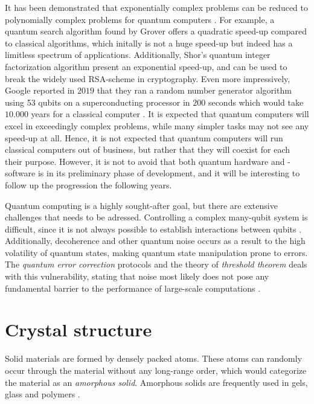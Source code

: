 It has been demonstrated that exponentially complex problems can be reduced to polynomially complex problems for quantum computers \cite{Pavicic2006}. For example, a quantum search algorithm found by Grover \cite{Grover1997} offers a quadratic speed-up compared to classical algorithms, which initally is not a huge speed-up but indeed has a limitless spectrum of applications. Additionally, Shor's quantum integer factorization algorithm \cite{Shor1994} present an exponential speed-up, and can be used to break the widely used RSA-scheme in cryptography. Even more impressively, Google reported in $2019$ that they ran a random number generator algorithm using 53 qubits on a superconducting processor in $200$ seconds which would take $10.000$ years for a classical computer \cite{Martinis2019}. It is expected that quantum computers will excel in exceedingly complex problems, while many simpler tasks may not see any speed-up at all. Hence, it is not expected that quantum computers will run classical computers out of business, but rather that they will coexist for each their purpose. However, it is not to avoid that both quantum  hardware and -software is in its preliminary phase of development, and it will be interesting to follow up the progression the following years.

Quantum computing is a highly sought-after goal, but there are extensive challenges that needs to be adressed. Controlling a complex many-qubit system is difficult, since it is not always possible to establish interactions between qubits \cite{DiVincenzo2000}. Additionally, decoherence and other quantum noise occurs as a result to the high volatility of quantum states, making quantum state manipulation prone to errors. The \textit{quantum error correction} protocols and the theory of \textit{threshold theorem} deals with this vulnerability, stating that noise most likely does not pose any fundamental barrier to the performance of large-scale computations \cite{Pavicic2006}.



\section{Crystal structure}


Solid materials are formed by densely packed atoms. These atoms can randomly occur through the material without any long-range order, which would categorize the material as an \textit{amorphous solid}. Amorphous solids are frequently used in gels, glass and polymers \cite{BenStreetman2015}.

